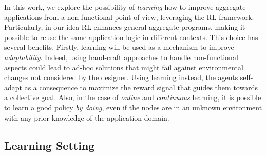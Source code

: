 %
% 

In this work, we explore the possibility of \emph{learning} 
 how to improve aggregate applications from a non-functional point of view, 
 leveraging the \ac{RL} framework.
%
%
Particularly, in our idea \ac{RL} enhances general aggregate programs, 
 making it possible to reuse the same application logic in different contexts.
%
This choice has several benefits.
 Firstly, learning will be used as a mechanism to improve \emph{adaptability}. 
 Indeed, using hand-craft approaches to handle non-functional aspects 
 could lead to ad-hoc solutions that might fail against environmental 
 changes not considered by the designer.
%
Using learning instead, the agents self-adapt as a consequence 
 to maximize the reward signal that guides them towards a collective goal. 
%
Also, in the case of \emph{online} and \emph{continuous} learning, 
 it is possible to learn a good policy \emph{by doing}, 
 even if the nodes are in an unknown environment with any prior knowledge of the application domain.
%

\subsection{Learning Setting}\label{acsos2022:sec:learning-setting}

